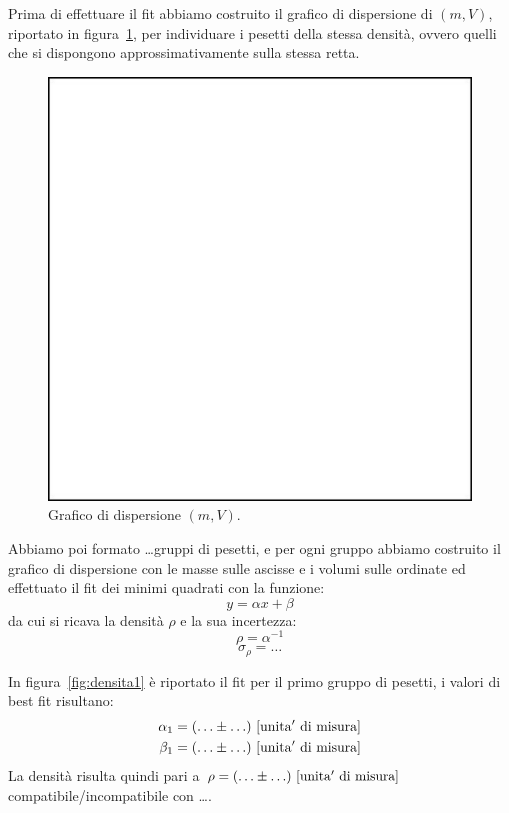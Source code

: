 \documentclass[a4paper]{article}
\begin{document}
Prima di effettuare il fit abbiamo costruito il grafico di dispersione di $(m,V)$, riportato in figura~\ref{fig:dispersione},
per individuare i pesetti della stessa densit\`a, ovvero quelli che si dispongono approssimativamente sulla stessa retta.

\begin{figure}
    \centering
     \includegraphics[width=0.5\linewidth]{blankfig.pdf}
    \caption{Grafico di dispersione $(m,V)$.}
    \label{fig:dispersione}
\end{figure}

Abbiamo poi formato \ldots gruppi di pesetti, e per ogni gruppo abbiamo costruito il grafico di dispersione con le masse sulle ascisse e i volumi sulle ordinate ed effettuato il fit dei minimi quadrati con la funzione:
\begin{equation}
    y = \alpha x + \beta
\end{equation}
da cui si ricava la densit\`a $\rho$ e la sua incertezza:
\begin{equation}
    \rho = \alpha^{-1}
\end{equation}
\begin{equation}
    \sigma_{\rho} = \ldots
\end{equation}

In figura~\ref{fig:densita1} \`e riportato il  fit per il primo gruppo di pesetti, i valori di best fit risultano:
\begin{eqnarray}
    \alpha_1 = (\ldots \pm \ldots)\ \rm [unita'\ di\ misura] \\
    \beta_1 = (\ldots \pm \ldots)\ \rm [unita'\ di\ misura]
\end{eqnarray}
La densit\`a risulta quindi pari a $\rho = (\ldots\pm\ldots)\ \rm [unita'\ di\ misura]$ compatibile/incompatibile con \ldots.
\end{document}
